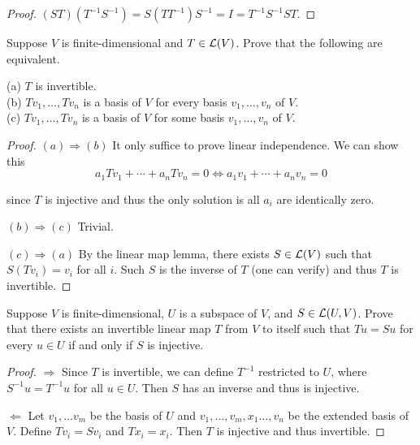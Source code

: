 \documentclass{extarticle}
\begin{document}
\begin{proof}
\((ST)(T^{-1}S^{-1}) = S(T T^{-1})S^{-1} = I = T^{-1}S^{-1}S T\).
\end{proof}

\begin{problem}{3}
    Suppose \(V\) is finite-dimensional and \(T \in \mathcal{L}(V)\). Prove that the following are equivalent.

    (a) \(T\) is invertible. \\ 
    (b) \(T v_1, \ldots, T v_n\) is a basis of \(V\) for every basis \(v_1, \ldots, v_n\) of \(V\). \\ 
    (c) \(T v_1, \ldots, T v_n\) is a basis of \(V\) for some basis \(v_1, \ldots, v_n\) of \(V\). 
\end{problem}

\begin{proof}
\((a) \Rightarrow (b)\) It only suffice to prove linear independence. We can show this 
\[a_1 Tv_1 + \cdots + a_n T v_n = 0 \Longleftrightarrow a_1 v_1 + \cdots + a_n v_n = 0\]

since \(T\) is injective and thus the only solution is all \(a_i\) are identically zero. 

\((b) \Rightarrow (c)\) Trivial. 

\((c) \Rightarrow (a)\) By the linear map lemma, there exists \(S \in \mathcal{L}(V)\) such that 
\(S(T v_i) = v_i\) for all \(i\). Such \(S\) is the inverse of \(T\) (one can verify) and thus 
\(T\) is invertible. 
\end{proof}


\begin{problem}{5}
    Suppose \(V\) is finite-dimensional, \(U\) is a subspace of \(V\), and \(S \in \mathcal{L}(U, V)\). Prove 
    that there exists an invertible linear map \(T\) from \(V\) to itself such that 
    \(T u = Su\) for every \(u \in U\) if and only if \(S\) is injective. 
\end{problem}

\begin{proof}
\(\Rightarrow\) Since \(T\) is invertible, we can define \(T^{-1}\) restricted to \(U\), where 
\(S^{-1} u = T^{-1}u \) for all \(u \in U\). Then \(S\) has an inverse and thus is injective. 

\(\Leftarrow\) Let \(v_1, \ldots v_m\) be the basis of \(U\) and \(v_1, \ldots, v_m, x_1 \ldots, v_n\) 
be the extended basis of \(V\). Define \(T v_i = S v_i\) and \(T x_i = x_i\). Then \(T\) is injective 
and thus invertible. 
\end{proof}
\end{document}
